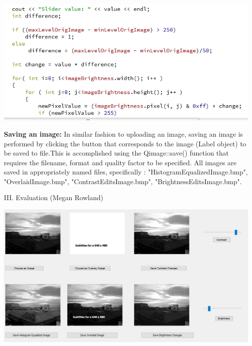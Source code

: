\documentclass{article}
\newenvironment{Figure}
  {\par\medskip\noindent\ignorespaces\minipage{\linewidth}}
  {\endminipage\par\medskip}
\begin{document}
\begin{multicols*}{2}
\begin{Figure}
 \centering
 \includegraphics[width=\linewidth]{brightnessadjustment.png}
\end{Figure}


{\bf Saving an image:} 
In similar fashion to uploading an image, saving an image is performed by clicking the button that corresponds to the image (Label object) to be saved to file.This is accomplished using the Qimage::save() function that requires the filename, format and quality factor to be specified. All images are saved in appropriately named files, specifically :  "HistogramEqualizedImage.bmp", "OverlaidImage.bmp", "ContrastEditsImage.bmp", "BrightnessEditsImage.bmp".



\begin{center}
{\large III. Evaluation (Megan Rowland)}\\
\end{center}

\begin{Figure}
 \centering
 \includegraphics[width=\linewidth]{Image2GUI.jpg}
\end{Figure}



\end{multicols*}
\end{document}
